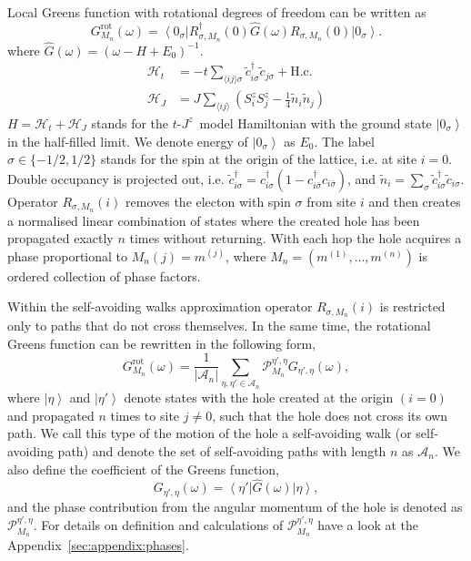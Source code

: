 \documentclass[%
 reprint,
 amsmath,amssymb,
 aps,
prb,
floatfix,
]{revtex4-1}
\newcommand{\tjzm}{$t$-$J^z$~model}
\newcommand{\ket}[1]{\left\vert #1 \right\rangle}
\newcommand{\bra}[1]{\left\langle #1 \right\vert}
\newcommand{\abs}[1]{\left\vert #1 \right\vert}
\newcommand{\mean}[1]{\langle#1\rangle}
\begin{document}
Local Greens function with rotational degrees of freedom can be written as
\begin{equation}
    G^{\text{rot}}_{M_n}(\omega) = 
    \bra{0_\sigma}R^{\dag}_{\sigma,M_n}(0) 
        \hat{G}(\omega)
    R_{\sigma,M_n}(0) \ket{0_\sigma}.
\end{equation}
where $\hat{G}(\omega) = (\omega - H + E_0)^{-1}$.  
\begin{align}
	\mathcal{H}_t &= -t\sum_{\mean{ij}\sigma} \tilde{c}_{i\sigma}^\dag \tilde{c}_{j\sigma}
	+ \mathrm{H.c.} \\
	\mathcal{H}_J &= J\sum_{\mean{ij}} \left(S_i^z S_j^z - \frac{1}{4}\tilde{n}_i \tilde{n}_j\right)
\end{align}
$H = \mathcal{H}_t + \mathcal{H}_J$ stands for the \tjzm{} Hamiltonian with the ground state $\ket{0_\sigma}$ in the half-filled limit. We denote energy of $\ket{0_\sigma}$ as $E_0$. The label $\sigma \in \{-1/2, 1/2\}$ stands for the spin at the origin of the lattice, i.e. at site $i = 0$. Double occupancy is projected out, i.e. $\tilde{c}_{i\sigma}^\dag = c_{i\sigma}^\dag (1 - c_{i\bar{\sigma}}^\dag c_{i\bar{\sigma}})$, and $\tilde{n}_i = \sum_{\sigma} \tilde{c}_{i\sigma}^\dag \tilde{c}_{i\sigma}$. Operator $R_{\sigma,M_n}(i)$ removes the electon with spin $\sigma$ from site $i$ and then creates a normalised linear combination of states where the created hole has been propagated exactly $n$ times without returning. With each hop the hole acquires a phase proportional to $M_n(j) = m^{(j)}$, where $M_n = (m^{(1)}, ..., m^{(n)})$ is ordered collection of phase factors.

Within the self-avoiding walks approximation operator $R_{\sigma,M_n}(i)$ is restricted only to paths that do not cross themselves. In the same time, the rotational Greens function can be rewritten in the following form,
\begin{equation}
    G^{\text{rot}}_{M_n}(\omega) = 
    \frac{1}{\abs{\mathcal{A}_n}}\sum_{\eta, \eta' \in \mathcal{A}_n}
	\mathcal{P}_{M_n}^{\eta',\eta}
        G_{\eta', \eta}(\omega),
\end{equation}
where $\ket{\eta}$ and $\ket{\eta'}$ denote states with the hole created at the origin $(i = 0)$ and propagated $n$ times to site $j \neq 0$, such that the hole does not cross its own path. We call this type of the motion of the hole a self-avoiding walk (or self-avoiding path) and denote the set of self-avoiding paths with length $n$ as $\mathcal{A}_n$. We also define the coefficient of the Greens function,
\begin{equation}
    G_{\eta', \eta}(\omega) = \bra{\eta'}\hat{G}(\omega)\ket{\eta},
\end{equation}
and the phase contribution from the angular momentum of the hole is denoted as $\mathcal{P}_{M_n}^{\eta',\eta}$. For details on definition and calculations of $\mathcal{P}_{M_n}^{\eta',\eta}$ have a look at the Appendix~\ref{sec:appendix:phases}. 
\end{document}
